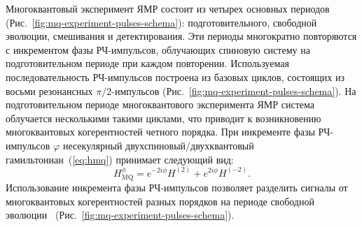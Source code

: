 %

%
%
%
%
%

%
%
%


Многоквантовый эксперимент ЯМР состоит из четырех основных периодов (Рис.~\ref{fig:mq-experiment-pulses-schema}): подготовительного, свободной эволюции, смешивания и детектирования.
Эти периоды многократно повторяются с инкрементом фазы РЧ-импульсов, облучающих спиновую систему на подготовительном периоде при каждом повторении. Используемая последовательность РЧ-импульсов построена из базовых циклов, состоящих из восьми резонансных $\pi/2$-импульсов (Рис.~\ref{fig:mq-experiment-pulses-schema}).
На подготовительном периоде многоквантового эксперимента ЯМР
система облучается несколькими такими циклами,
что приводит к возникновению многоквантовых когерентностей четного порядка.
При инкременте фазы РЧ-импульсов $\varphi$ несекулярный двухспиновый/двухквантовый гамильтониан~(\ref{eq:hmq}) принимает следующий вид:
%
\begin{equation}\label{eq:hmq-phased}
    H_\mathrm{MQ}^{\phi} = e^{-2i\phi}H^{(2)} + e^{2i\phi}H^{(-2)}.
\end{equation}
%
Использование инкремента фазы РЧ-импульсов позволяет разделить сигналы от многоквантовых когерентностей разных порядков на периоде свободной эволюции~\cite{Shykind1988} (Рис.~\ref{fig:mq-experiment-pulses-schema}).

